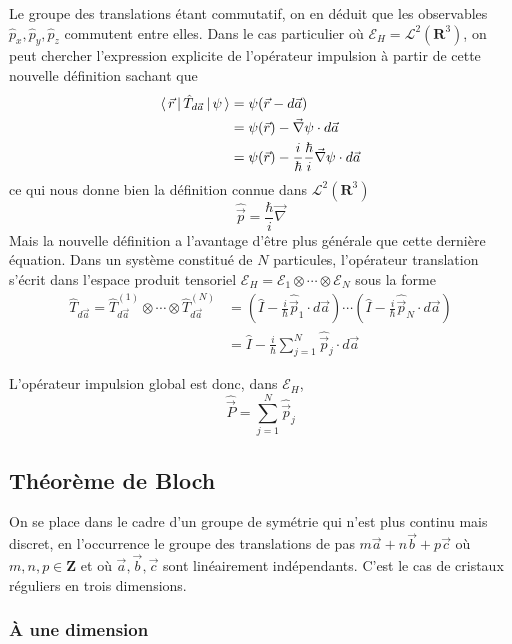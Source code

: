     Le groupe des translations étant commutatif, on en déduit que les observables $\hat{p}_x, \hat{p}_y, \hat{p}_z$ commutent entre elles. Dans le cas particulier où $\mathcal{E}_H = \mathcal{L}^2(\mathbf{R}^3)$, on peut chercher l’expression explicite de l’opérateur impulsion à partir de cette nouvelle définition sachant que 
    \begin{align*}
        \left< \, \vec{r} \, \right| \hat{T}_{d\vec{a}} \left| \, \psi \, \right> 
        &= \psi(\vec{r} - d\vec{a}) \\
        &= \psi(\vec{r}) - \vec{\nabla}\psi \cdot d\vec{a} \\
        &= \psi(\vec{r}) - \frac{i}{\hbar} \frac{\hbar}{i} \vec{\nabla}\psi \cdot d\vec{a}
    \end{align*}
    ce qui nous donne bien la définition connue dans $\mathcal{L}^2(\mathbf{R}^3)$ 
    \[ \hat{\vec{p}} = \frac{\hbar}{i} \vec{\nabla} \]   
    Mais la nouvelle définition a l’avantage d’être plus générale que cette dernière équation. Dans un système constitué de $N$ particules, l’opérateur translation s’écrit dans l’espace produit tensoriel $\mathcal{E}_H = \mathcal{E}_1 \otimes \cdots \otimes \mathcal{E}_N$ sous la forme 
    \begin{align*}
        \hat{T}_{d\vec{a}} = \hat{T}_{d\vec{a}}^{(1)} \otimes \cdots \otimes \hat{T}_{d\vec{a}}^{(N)} 
        &= \left(\hat{I} - \frac{i}{\hbar}\hat{\vec{p}}_1 \cdot d\vec{a}\right)\cdots\left(\hat{I} - \frac{i}{\hbar}\hat{\vec{p}}_N \cdot d\vec{a}\right) \\
        &= \hat{I} - \frac{i}{\hbar} \sum_{j=1}^N \hat{\vec{p}}_j \cdot d\vec{a}
    \end{align*}

    L’opérateur impulsion global est donc, dans $\mathcal{E}_H$,
    \[ \hat{\vec{P}} = \sum_{j=1}^N \hat{\vec{p}}_j \]   

    \subsection{Théorème de Bloch}

    On se place dans le cadre d’un groupe de symétrie qui n’est plus continu mais discret, en l’occurrence le groupe des translations de pas $m \vec{a} + n \vec{b} + p \vec{c}$ où $m,n,p \in \mathbf{Z}$ et où $\vec{a},\vec{b},\vec{c}$ sont linéairement indépendants. C’est le cas de cristaux réguliers en trois dimensions.
        
        \subsubsection{À une dimension}

